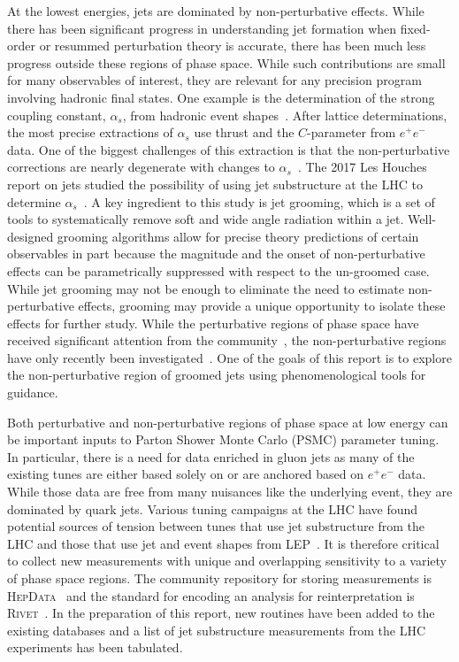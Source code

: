 \documentclass[11pt]{cernrep}
\begin{document}
At the lowest energies, jets are dominated by non-perturbative effects.  While there has been significant progress in understanding jet formation when fixed-order or resummed perturbation theory is accurate, there has been much less progress outside these regions of phase space.  While such contributions are small for many observables of interest, they are relevant for any precision program involving hadronic final states.  One example is the determination of the strong coupling constant, $\alpha_s$, from hadronic event shapes~\cite{Abbate:2010xh,Hoang:2015hka,TheALEPHCollaboration2004,DELPHICollaboration1997,Abdallah:2004xe,Biebel:1999zt,Abbiendi:2004qz,Buskulic:1992hq}.   After lattice determinations, the most precise extractions of $\alpha_s$ use thrust and the $C$-parameter from $e^+e^-$ data.  One of the biggest challenges of this extraction is that the non-perturbative corrections are nearly degenerate with changes to $\alpha_s$~\cite{Abbate:2010xh}.  The 2017 Les Houches report on jets studied the possibility of using jet substructure at the LHC to determine $\alpha_s$~\cite{Bendavid:2018nar}.  A key ingredient to this study is jet grooming, which is a set of tools to systematically remove soft and wide angle radiation within a jet.  Well-designed grooming algorithms allow for precise theory predictions of certain observables in part because the magnitude and the onset of non-perturbative effects can be parametrically suppressed with respect to the un-groomed case.  While jet grooming may not be enough to eliminate the need to estimate non-perturbative effects, grooming may provide a unique opportunity to isolate these effects for further study.   While the perturbative regions of phase space have received significant attention from the community~\cite{Frye:2016aiz,Frye:2016okc,Marzani:2017mva,Marzani:2017kqd,Kang:2018vgn,Kang:2018jwa,Baron:2018nfz,Kardos:2018kth}, the non-perturbative regions have only recently been investigated~\cite{Hoang:2019ceu}.   One of the goals of this report is to explore the non-perturbative region of groomed jets using phenomenological tools for guidance. 

Both perturbative and non-perturbative regions of phase space at low energy can be important inputs to Parton Shower Monte Carlo (PSMC) parameter tuning.  In particular, there is a need for data enriched in gluon jets as many of the existing tunes are either based solely on or are anchored based on $e^+e^-$ data.  While those data are free from many nuisances like the underlying event, they are dominated by quark jets.  Various tuning campaigns at the LHC have found potential sources of tension between tunes that use jet substructure from the LHC and those that use jet and event shapes from LEP~\cite{ATL-PHYS-PUB-2014-021,Aad:2016oit}.  It is therefore critical to collect new measurements with unique and overlapping sensitivity to a variety of phase space regions.  The community repository for storing measurements is \textsc{HepData}~\cite{Buckley:2010jn,Maguire:2017ypu} and the standard for encoding an analysis for reinterpretation is \textsc{Rivet}~\cite{Buckley:2010ar}.  In the preparation of this report, new routines have been added to the existing databases and a list of jet substructure measurements from the LHC experiments has been tabulated.
\end{document}
